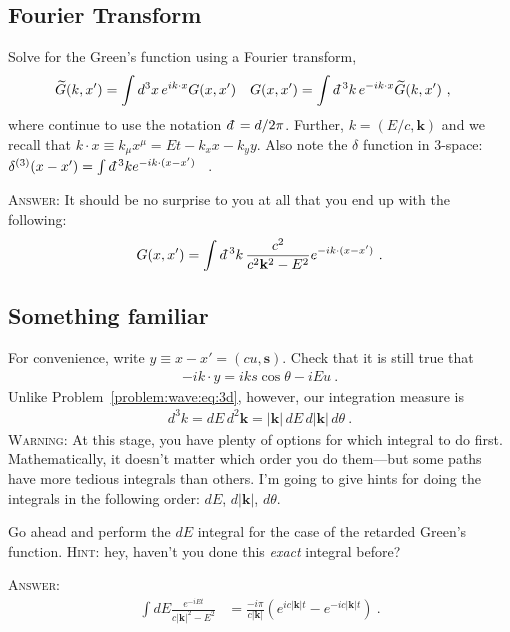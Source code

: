 \documentclass[12pt]{article}
\numberwithin{equation}{section}    %
\renewcommand{\tilde}{\widetilde}   %
\renewcommand{\vec}[1]{\mathbf{#1}} %
\newcommand{\dbar}{d\mkern-6mu\mathchar'26}    %
\begin{document}
\subsection{Fourier Transform}

Solve for the Green's function using a Fourier transform,
\begin{align}
	\tilde G(k,x') &= \int d^3x \, e^{ik\cdot x} G(x,x')
	&
	G(x,x') &= \int \dbar^3k \, e^{-ik\cdot x} \tilde G(k,x') \ ,
\end{align}
where continue to use the notation $\dbar = d/2\pi$. Further, $k = (E/c,\vec k)$ and we recall that $k\cdot x \equiv k_\mu x^\mu = Et - k_x x - k_y y$. Also note the $\delta$ function in 3-space: $\delta^{(3)}(x-x') = \int \dbar^3 k e^{-ik\cdot (x-x')}$ \ .

\textsc{Answer:} It should be no surprise to you at all that you end up with the following:
\begin{align}
	G(x,x') = \int \dbar^3k \, \frac{c^2}{c^2 \vec k^2 - E^2} e^{-ik\cdot (x-x')} \ .
	\label{eq:G:ft}
\end{align} 


\subsection{Something familiar}

For convenience, write $y \equiv x-x' = (cu,\mathbf{s})$. Check that it is still true that
\begin{align}
	-ik\cdot y = i k s \cos \theta  - i E u \ .
\end{align}
Unlike Problem~\ref{problem:wave:eq:3d}, however, our integration measure is
\begin{align}
	d^3 k = dE \, d^2\vec k = |\vec k| \,dE \,  d|\vec k| \, d \theta  \ .
\end{align}
\textsc{Warning:} At this stage, you have plenty of options for which integral to do first. Mathematically, it doesn't matter which order you do them---but some paths have more tedious integrals than others. I'm going to give hints for doing the integrals in the following order: $dE$, $d|\vec k|$, $d\theta$. 


Go ahead and perform the $dE$ integral for the case of the retarded Green's function. \textsc{Hint}: hey, haven't you done this \emph{exact} integral before? 

\textsc{Answer}:
\begin{align}
\int dE \frac{e^{-iEt}}{c|\vec k|^2 -E^2}
&=
\frac{-i\pi}{c|\vec k|} 
\left(
e^{ic|\vec k| t}
-
e^{-ic|\vec k| t}
\right) \ .
\label{eq:dE}
\end{align}
\end{document}
